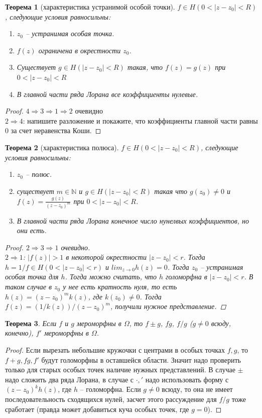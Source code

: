 \documentclass[12pt, letterpaper]{article}
\newtheorem{theorem}{Теорема}[section]
\begin{document}
\begin{theorem}[характеристика устранимой особой точки]
$f \in H(0 < |z-z_0| < R)$, следующие условия равносильны:
\begin{enumerate}
\item $z_0$ -- устранимая особая точка.
\item $f(z)$ ограничена в окрестности $z_0$.
\item Существует $g \in H(|z-z_0| < R)$ такая, что $f(z)=g(z)$ при $0 < |z-z_0| < R$
\item В главной части ряда Лорана все коэффициенты нулевые.
\end{enumerate}
\end{theorem}
\begin{proof}
$4 \Rightarrow 3 \Rightarrow 1 \Rightarrow 2$ очевидно\\
$2 \Rightarrow 4$: напишите разложение и покажите, что коэффициенты главной части равны 0 за счет неравенства Коши.
\end{proof}

\begin{theorem}[характеристика полюса]
$f \in H(0 < |z-z_0| < R)$, следующие условия равносильны:
\begin{enumerate}
\item $z_0$ -- полюс.
\item существует $m \in \mathbb{N}$ и $g \in H(|z-z_0|<R)$ такая что $g(z_0) \neq 0$ и $f(z) = \frac{g(z)}{(z-z_0)^m}$ при $0 < |z-z_0| < R$.
\item В главной части ряда Лорана конечное число нунелвых коэффициентов, но они есть.
\end{enumerate}
\begin{proof}
$2 \Rightarrow 3 \Rightarrow 1$ очевидно.\\
$2 \Rightarrow 1$: $|f(z)| > 1$ в некоторой окрестности $|z-z_0|<r$. Тогда $h = 1/f \in H(0<|z-z_0|<r)$ и $lim_{z\rightarrow 0} h(z) = 0$. Тогда $z_0$ -- устранимая особая точка для $h$. Тогда можно считать, что $h$ голоморфна в $|z-z_0| < r$. В таком случае в $z_0$ у нее есть кратность нуля, то есть $h(z) = (z-z_0)^m k(z)$, где $k(z_0) \neq 0$. Тогда $f(z) = (1/k(z))/(z-z_0)^m$, получили нужное представление. 
\end{proof}
\end{theorem}

\begin{theorem} Если $f$ и $g$ мероморфны в $\Omega$, то $f \pm g$, $fg$, $f/g$ ($g \neq 0$ всюду, конечно), $f'$ мероморфны в $\Omega$.
\end{theorem}
\begin{proof}
Если вырезать небольшие кружочки с центрами в особых точках $f,g$, то $f+g, fg, f'$ будут голоморфны в оставшейся области. Значит надо проверить только для старых особых точек наличие нужных представлений. В случае $\pm$ надо сложить два ряда Лорана, в случае с $\cdot, '$ надо использовать форму с $(z-z_0)^k h(z)$, где $h$ -- голоморфна. Если $g \neq 0$ всюду, то она не имеет последовательность сходящихся нулей, засчет этого рассуждение для $f / g$ тоже сработает (правда может добавиться куча особых точек, где $g = 0$).
\end{proof}
\end{document}
